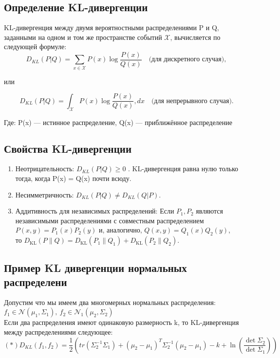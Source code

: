 \subsection*{Определение KL-дивергенции}

KL-дивергенция между двумя вероятностными распределениями  P и Q, заданными на одном и том же пространстве событий $\mathcal{X}$, вычисляется по следующей формуле:
\[
    D_{KL}(P | Q) = \sum_{x \in \mathcal{X}} P(x) \log \frac{P(x)}{Q(x)} \quad \text{(для дискретного случая)},
\]

или

\[
    D_{KL}(P | Q) = \int_{\mathcal{X}} P(x) \log \frac{P(x)}{Q(x)} , dx \quad \text{(для непрерывного случая)}.
\]

Где:
P(x) — истинное распределение,
Q(x) — приближённое распределение

\subsection*{Свойства KL-дивергенции}
\begin{enumerate}
    \item Неотрицательность: $ D_{KL}(P | Q) \geq 0 $ . KL-дивергенция равна нулю только тогда, когда P(x) = Q(x)  почти всюду.
    \item Несимметричность: $ D_{KL}(P | Q) \neq D_{KL}(Q | P) $.
    \item Аддитивность для независимых распределений:
          Если $\displaystyle P_{1},P_{2}$ являются независимыми распределениями с совместным распределением $\displaystyle P(x,y)=P_{1}(x)P_{2}(y)$ и, аналогично, $\displaystyle Q(x,y)=Q_{1}(x)Q_{2}(y)$,\\ то $\displaystyle D_{\mathrm {KL} }(P\parallel Q)=D_{\mathrm {KL} }(P_{1}\parallel Q_{1})+D_{\mathrm {KL} }(P_{2}\parallel Q_{2}).$
\end{enumerate}


\subsection*{Пример KL дивергенции нормальных распределени}
Допустим что мы имеем два многомерных нормальных распределения: $f_1 \in \mathcal{N}(\mu_1, \Sigma_1), \ f_2 \in \mathcal{N}_1(\mu_2, \Sigma_2)$
\\
Если два распределения имеют одинаковую размерность k, то KL-дивергенция между распределениями следующее:
\[ (*)
    D_{KL}(f_1, f_2) = \frac{1}{2} (tr (\Sigma_2^{-1} \Sigma_1) + (\mu_2 - \mu_1)^T\Sigma_2^{-1}(\mu_2 - \mu_1) - k + \ln\left( \frac{\det \Sigma_2}{\det \Sigma_1} \right) )
\]


